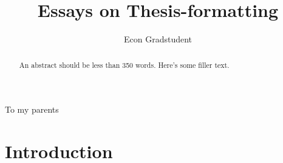 \documentclass[11pt]{gsasthesis} %
\title{Essays on Thesis-formatting} %
\author{Econ Gradstudent} %
\begin{document}


\thesistitlepage
\copyrightpage
\begin{abstract}
  An abstract should be less than 350 words. Here's some filler text. \blindtext
\end{abstract}

\renewcommand{\contentsname}{\protect\centering\protect\Large Contents}
\renewcommand{\listtablename}{\protect\centering\protect\Large List of Tables}
\renewcommand{\listfigurename}{\protect\centering\protect\Large List of Figures}

\tableofcontents %

\listoftables
\listoffigures
\begin{acknowledgments}
  \blindtext
\end{acknowledgments}
\begin{dedication}
  To my parents
\end{dedication}



{}
\chapter*{Introduction}
\label{ch:intro}

\end{document}
